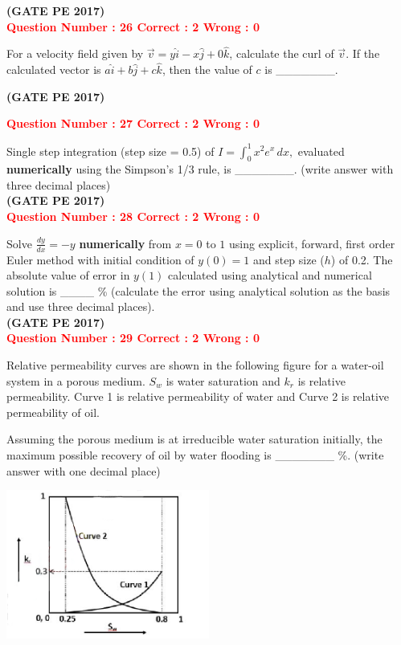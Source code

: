 \documentclass[12pt]{article}
\begin{document}
{\hfill\textbf{(GATE PE 2017)}\\[0.6cm]

\textcolor{red}{\textbf{Question Number : 26 \hfill Correct : 2  Wrong : 0}}

For a velocity field given by $\vec{v} = y \hat{i} - x \hat{j} + 0 \hat{k}$, calculate the curl of $\vec{v}$. If the calculated vector is $a \hat{i} + b \hat{j} + c \hat{k}$, then the value of $c$ is \_\_\_\_\_\_\_.

\hfill\textbf{(GATE PE 2017)}\\[0.6cm]

\newpage


\textcolor{red}{\textbf{Question Number : 27 \hfill Correct : 2  Wrong : 0}}

Single step integration (step size = 0.5) of 
$ 
I = \int_0^1 x^2 e^x \, dx,
$
evaluated \textbf{numerically} using the Simpson’s 1/3 rule, is \_\_\_\_\_\_\_. (write answer with three decimal places)\\

\hfill\textbf{(GATE PE 2017)}\\[0.6cm]


\textcolor{red}{\textbf{Question Number : 28 \hfill Correct : 2  Wrong : 0}}

Solve 
{\LARGE$ 
\frac{dy}{dx} = -y
$ }
\textbf{numerically} from $x = 0$ to $1$ using explicit, forward, first order Euler method with initial condition of $y(0) = 1$ and step size ($h$) of 0.2. The absolute value of error in $y(1)$ calculated using analytical and numerical solution is \_\_\_\_ \% (calculate the error using analytical solution as the basis and use three decimal places).\\

\hfill\textbf{(GATE PE 2017)}\\[0.6cm]


\textcolor{red}{\textbf{Question Number : 29 \hfill Correct : 2  Wrong : 0}}

Relative permeability curves are shown in the following figure for a water-oil system in a porous medium. $S_w$ is water saturation and $k_r$ is relative permeability. Curve 1 is relative permeability of water and Curve 2 is relative permeability of oil.

Assuming the porous medium is at irreducible water saturation initially, the maximum possible recovery of oil by water flooding is \_\_\_\_\_\_\_ \%. (write answer with one decimal place)\\

\begin{center}
    \includegraphics[width=0.5\textwidth]{Figs/GraphQ_29.png} 
\end{center}

}
\end{document}
